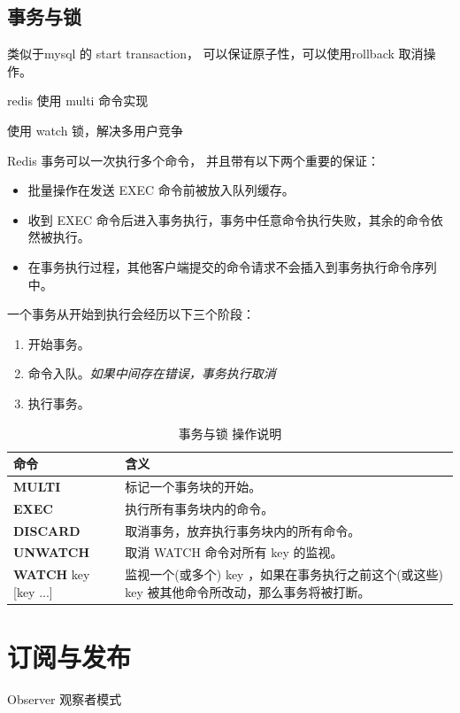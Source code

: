 \documentclass[UTF8,a4paper,12pt]{ctexbook}
\begin{document}
	\section{事务与锁}
		类似于mysql 的 start transaction， 可以保证原子性，可以使用rollback 取消操作。
		
		redis 使用 multi  命令实现
		
		使用 watch 锁，解决多用户竞争
		
		Redis 事务可以一次执行多个命令， 并且带有以下两个重要的保证：
			\begin{itemize}[itemindent = 2em]
				\item 批量操作在发送 EXEC 命令前被放入队列缓存。
				\item 收到 EXEC 命令后进入事务执行，事务中任意命令执行失败，其余的命令依然被执行。
				\item 在事务执行过程，其他客户端提交的命令请求不会插入到事务执行命令序列中。
			\end{itemize}
		
		一个事务从开始到执行会经历以下三个阶段：
			\begin{enumerate}[itemindent = 2em]
				\item 开始事务。
				\item 命令入队。\textit{如果中间存在错误，事务执行取消}
				\item 执行事务。
			\end{enumerate}
		
		\begin{table}[H]
			\centering
			\caption{事务与锁 操作说明}
			\begin{tabular}{p{5cm}<{\centering} | p{10cm}<{\centering}}
				\toprule
					命令 &  含义 \\
				\midrule
				\textbf{MULTI} 	 &  标记一个事务块的开始。	\\
				\textbf{EXEC} 	 & 	执行所有事务块内的命令。	\\
				\textbf{DISCARD} 	 &	取消事务，放弃执行事务块内的所有命令。	\\
				\textbf{UNWATCH} 	 &	取消 WATCH 命令对所有 key 的监视。	\\
				\textbf{WATCH} key [key ...] 	 &	监视一个(或多个) key ，如果在事务执行之前这个(或这些) key 被其他命令所改动，那么事务将被打断。	\\
				\bottomrule
			\end{tabular}
		\end{table}

\chapter{订阅与发布}
	Observer 观察者模式
	
\end{document}
